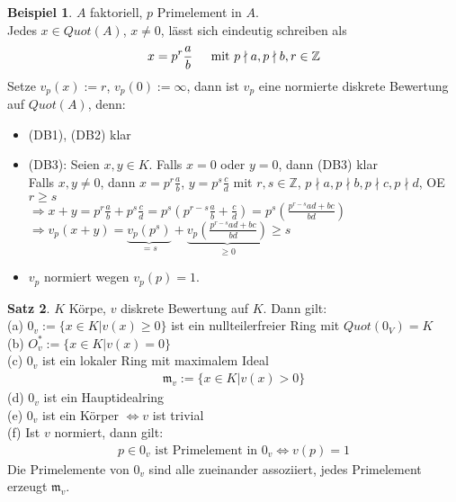 \documentclass[10pt,a4paper,numbers=endperiod]{scrreprt}
\theoremstyle{definition}
\newtheorem{satz}{Satz}[section]
\newtheorem{bsp}[satz]{Beispiel}
\def\ZZ{{\mathbb Z}}
\begin{document}
\begin{bsp}
	$A$ faktoriell, $p$ Primelement in $A$.\\
	Jedes $x \in Quot(A)$, $x \neq 0$, lässt sich eindeutig schreiben als \begin{align*}
		x = p^r \frac{a}{b} \hspace*{4mm} \text{ mit } p \nmid a, p \nmid b, r \in \ZZ
	\end{align*}
	Setze $v_p(x) := r$, $v_p(0) := \infty$, dann ist $v_p$ eine normierte diskrete Bewertung auf $Quot(A)$, denn: \begin{itemize}
		\item (DB1), (DB2) klar
		\item (DB3): Seien $x, y \in K$. Falls $x = 0$ oder $y = 0$, dann (DB3) klar\\
		Falls $x, y \neq 0$, dann $x = p^r \frac{a}{b}$, $y = p^s \frac{c}{d}$ mit $r, s \in \ZZ$, $p \nmid a, p \nmid b, p \nmid c, p \nmid d$, OE $r \geq s$\\
		$\Rightarrow x +y = p^r \frac{a}{b} + p^s \frac{c}{d} = p^s(p^{r-s} \frac{a}{b} + \frac{c}{d}) = p^s(\frac{p^{r-s}ad + bc}{bd})$\\
		$\Rightarrow v_p(x+y) = \underbrace{v_p(p^s)}_{=s} + \underbrace{v_p(\frac{p^{r-s} ad + bc}{bd})}_{\geq 0} \geq s$
		\item $v_p$ normiert wegen $v_p(p) = 1$.
	\end{itemize}
\end{bsp}

\begin{satz}
	$K$ Körpe, $v$ diskrete Bewertung auf $K$. Dann gilt:\\
	(a) $0_v := \{x \in K| v(x) \geq 0\}$ ist ein nullteilerfreier Ring mit $Quot(0_V) =K$\\
	(b) $O_v^* := \{x \in K| v(x) = 0\}$\\
	(c) $0_v$ ist ein lokaler Ring mit maximalem Ideal \begin{align*}
		\mathfrak{m}_v := \{x \in K| v(x) > 0\}
	\end{align*}
	(d) $0_v$ ist ein Hauptidealring\\
	(e) $0_v$ ist ein Körper $\Leftrightarrow v$ ist trivial\\
	(f) Ist $v$ normiert, dann gilt: \begin{align*}
		p \in 0_v \text{ ist Primelement in } 0_v \Leftrightarrow v(p) = 1
	\end{align*}
	Die Primelemente von $0_v$ sind alle zueinander assoziiert, jedes Primelement erzeugt $\mathfrak{m}_v$.
\end{satz}
\end{document}
